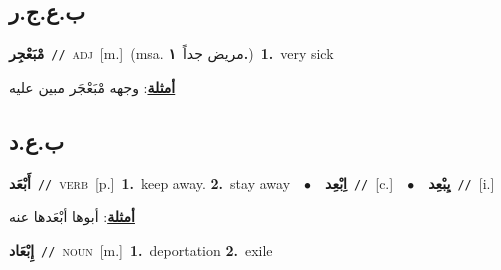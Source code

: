 \documentclass[10pt,a4paper,twoside]{article} %
\begin{document}
\begin{multicols}{2}
\vspace{-3mm}
\subsection*{\color{blue}\foreignlanguage{arabic}{ب.ع.ج.ر}\color{blue}{}} 

{\setlength\topsep{0pt}\textbf{\foreignlanguage{arabic}{مْبَعْجِر}}\ {\color{gray}\texttt{//}\color{black}}\ \textsc{adj}\ [m.]\ \color{gray}(msa. \foreignlanguage{arabic}{مريض جداً}~\foreignlanguage{arabic}{\textbf{١.}})\color{black}\ \textbf{1.}~very sick\  \begin{flushright}\color{gray}\foreignlanguage{arabic}{\textbf{\underline{\foreignlanguage{arabic}{أمثلة}}}: وجهه مْبَعْجَر مبين عليه}\end{flushright}\color{black}} \vspace{2mm}

\vspace{-3mm}
\subsection*{\color{blue}\foreignlanguage{arabic}{ب.ع.د}\color{blue}{}} 

{\setlength\topsep{0pt}\textbf{\foreignlanguage{arabic}{أَبْعَد}}\ {\color{gray}\texttt{//}\color{black}}\ \textsc{verb}\ [p.]\ \textbf{1.}~keep away.  \textbf{2.}~stay away\ \ $\bullet$\ \ \setlength\topsep{0pt}\textbf{\foreignlanguage{arabic}{اِبْعِد}}\ {\color{gray}\texttt{//}\color{black}}\ [c.]\ \ $\bullet$\ \ \setlength\topsep{0pt}\textbf{\foreignlanguage{arabic}{يِبْعِد}}\ {\color{gray}\texttt{//}\color{black}}\ [i.]\  \begin{flushright}\color{gray}\foreignlanguage{arabic}{\textbf{\underline{\foreignlanguage{arabic}{أمثلة}}}: أبوها أبْعَدها عنه}\end{flushright}\color{black}} \vspace{2mm}

{\setlength\topsep{0pt}\textbf{\foreignlanguage{arabic}{إِبْعَاد}}\ {\color{gray}\texttt{//}\color{black}}\ \textsc{noun}\ [m.]\ \textbf{1.}~deportation  \textbf{2.}~exile\ } \vspace{2mm}


\end{multicols}
\end{document}
